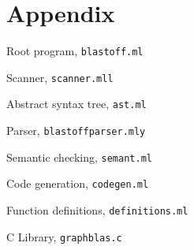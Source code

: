 \section{Appendix}

Root program, \verb=blastoff.ml=

Scanner, \verb=scanner.mll=

Abstract syntax tree, \verb=ast.ml=

Parser, \verb=blastoffparser.mly=

Semantic checking, \verb=semant.ml=

Code generation, \verb=codegen.ml=

Function definitions, \verb=definitions.ml=

C Library, \verb=graphblas.c=

